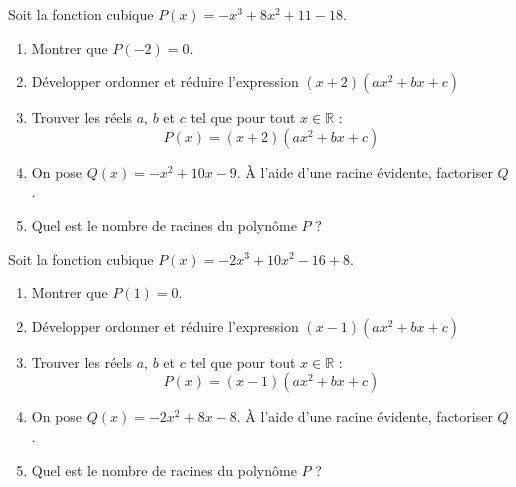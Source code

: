 \documentclass[main.tex]{subfiles}
\begin{document}
\begin{exercise} Soit la fonction cubique $P(x)=-x^3+8x^2+11-18$. 
	\begin{enumerate}[label=\alph*), leftmargin=*]
		\item Montrer que $P(-2)=0$.
		\item Développer ordonner et réduire l'expression $(x+2)(ax^2+bx+c)$
		\item Trouver les réels $a$, $b$ et $c$ tel que pour tout
		 $x\in\mathbb{R}$ : 
		 \setlength{\abovedisplayskip}{3pt}
		 \setlength{\belowdisplayskip}{3pt}
		$$
		P(x)= (x+2)(ax^2+bx+c)
		$$ 
	\item On pose $Q(x)=-x^2+10x-9$. À l'aide d'une racine évidente, factoriser $Q$. 
	\item Quel est le nombre de racines du polynôme $P$ ?
\end{enumerate} 
\end{exercise}
\begin{exercise}[entraînement]  Soit la fonction cubique $P(x)=-2x^3+10x^2-16+8$. 
	\begin{enumerate}[label=\alph*), leftmargin=*]
		\item Montrer que $P(1)=0$.
		\item Développer ordonner et réduire l'expression $(x-1)(ax^2+bx+c)$
		\item Trouver les réels $a$, $b$ et $c$ tel que pour tout
		$x\in\mathbb{R}$ : 
		\setlength{\abovedisplayskip}{3pt}
		\setlength{\belowdisplayskip}{3pt}
		$$
		P(x)= (x-1)(ax^2+bx+c)
		$$ 
		\item On pose $Q(x)=-2x^2+8x-8$. À l'aide d'une racine évidente, factoriser $Q$. 
		\item Quel est le nombre de racines du polynôme $P$ ?
	\end{enumerate} 
\end{exercise}
\vfill 
\end{document}
